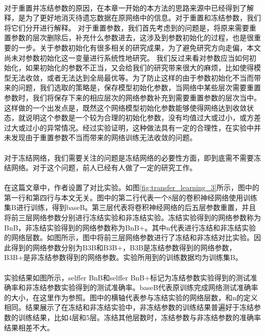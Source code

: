 \paragraph{}对于重置并冻结参数的原因，在本章一开始的本方法的思路来源中已经得到了解释，是为了更好地消灭待遗忘数据在原网络中的信息。对于重置和冻结参数，我们将它们分开进行解释。
对于重置参数，我们首先考虑到的问题是，将原来需要重置参数的层次删除后，补充什么参数进去，这涉及到参数初始化的过程，也是很重要的一步。关于参数初始化有很多相关的研究成果，为了避免研究方向走偏，本文尚未对参数初始化这一变量进行系统性地研究。
我们反过来看对参数应当如何初始化，如果初始化的参数不正当，又会给我们的研究带来很大的麻烦，比如使得模型无法收敛，或者无法达到全局最优等。为了防止这样的由于参数初始化不当而带来的问题，我们选取的策略是，保存模型初始化参数，当网络中某些层次需要重置参数时，我们将保存下来的相应层次的网络参数补充到需要重置参数的层次当中。这样做的一个出发点是，既然这个网络模型初始化参数能够使得网络达到收敛状态，就说明这个参数是一个较为合理的初始化参数，没有均值过大或过小，或方差过大或过小的异常情况。经过实验证明，这种做法具有一定的合理性，在实验中并未发现由于重置参数不当而带来的网络训练无法收敛的问题。
\paragraph{}对于冻结网络，我们需要关注的问题是冻结网络的必要性方面，即到底需不需要冻结网络。对于这个问题，前人已经有人做了一定的研究工作。
\paragraph{}在这篇文章\cite{yosinski_2014_NIPS}中，作者设置了对比实验。如图\ref{fig:transfer_learning_3}所示，图中的第一行和第四行与本文无关。图中的第二行代表一个8层的卷积神经网络使用训练集B进行训练，得到baseB。第三层代表将卷积神经网络的后五层参数重置，并且将前三层网络参数分别进行冻结实验和非冻结实验。冻结实验得到的网络参数称为BnB，非冻结实验得到的网络参数称为BnB+。其中n代表进行冻结和非冻结实验的网络层数。如图所示，图中将前三层网络参数进行了冻结和非冻结对比实验。因此得到的网络参数分别为B3B和B3B+，B3B是冻结参数得到的网络参数，B3B+是非冻结参数得到的网络参数。实验所用到的训练数据均为训练集B。
\paragraph{}实验结果如图所示，selffer BnB和selffer BnB+标记为冻结参数实验得到的测试准确率和非冻结参数实验得到的测试准确率。baseB代表原训练完成网络测试准确率的大小，在这里作为参照。图中的横轴代表参与冻结实验的网络层数，和n的定义相同。结果展示了在冻结和非冻结实验中，非冻结参数的训练结果普遍好于冻结参数的训练结果，比如4层和5层。冻结其他层数时，冻结参数与非冻结参数的准确率结果相差不大。
